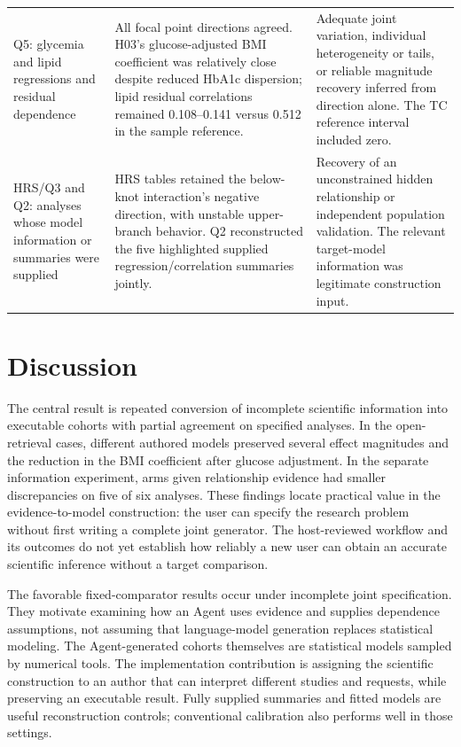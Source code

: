 \documentclass[11pt,letterpaper]{article}
\begin{document}
\begin{xltabular}{\linewidth}{@{}>{\raggedright\arraybackslash}X>{\raggedright\arraybackslash}X>{\raggedright\arraybackslash}X@{}}
Q5: glycemia and lipid regressions and residual dependence & All focal point directions agreed. H03's glucose-adjusted BMI coefficient was relatively close despite reduced HbA1c dispersion; lipid residual correlations remained 0.108–\allowbreak{}0.141 versus 0.512 in the sample reference. & Adequate joint variation, individual heterogeneity or tails, or reliable magnitude recovery inferred from direction alone. The TC reference interval included zero. \\

HRS/\allowbreak{}Q3 and Q2: analyses whose model information or summaries were supplied & HRS tables retained the below-knot interaction's negative direction, with unstable upper-branch behavior. Q2 reconstructed the five highlighted supplied regression/\allowbreak{}correlation summaries jointly. & Recovery of an unconstrained hidden relationship or independent population validation. The relevant target-model information was legitimate construction input. \\

\end{xltabular}

\endgroup

\section{Discussion}

The central result is repeated conversion of incomplete scientific information into executable cohorts with partial agreement on specified analyses. In the open-retrieval cases, different authored models preserved several effect magnitudes and the reduction in the BMI coefficient after glucose adjustment. In the separate information experiment, arms given relationship evidence had smaller discrepancies on five of six analyses. These findings locate practical value in the evidence-to-model construction: the user can specify the research problem without first writing a complete joint generator. The host-reviewed workflow and its outcomes do not yet establish how reliably a new user can obtain an accurate scientific inference without a target comparison.


The favorable fixed-comparator results occur under incomplete joint specification. They motivate examining how an Agent uses evidence and supplies dependence assumptions, not assuming that language-model generation replaces statistical modeling. The Agent-generated cohorts themselves are statistical models sampled by numerical tools. The implementation contribution is assigning the scientific construction to an author that can interpret different studies and requests, while preserving an executable result. Fully supplied summaries and fitted models are useful reconstruction controls; conventional calibration also performs well in those settings.
\end{document}
